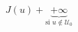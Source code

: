 \documentclass[preview]{standalone}
\begin{document}
\begin{align*}
J(u) + \underbrace{+\infty}_{\text{si }u\notin\mathcal{U}_0}
\end{align*}
\end{document}
